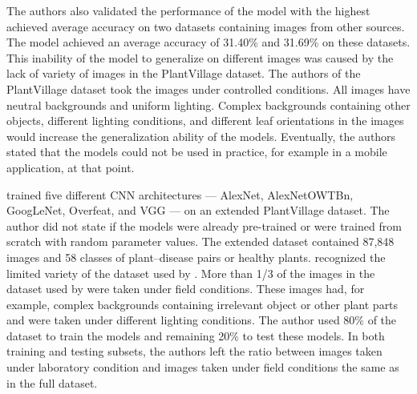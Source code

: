 \documentclass{BachelorBUI}
\begin{document}
        The authors also validated the performance of the model with the highest achieved average accuracy on two datasets containing images from other sources. The model achieved an average accuracy of 31.40\% and 31.69\% on these datasets. This inability of the model to generalize on different images was caused by the lack of variety of images in the PlantVillage dataset. The authors of the PlantVillage dataset took the images under controlled conditions. All images have neutral backgrounds and uniform lighting. Complex backgrounds containing other objects, different lighting conditions, and different leaf orientations in the images would increase the generalization ability of the models. Eventually, the authors stated that the models could not be used in practice, for example in a mobile application, at that point.

        \textcite{Ferentinos:2018} trained five different CNN architectures --- AlexNet, AlexNetOWTBn, GoogLeNet, Overfeat, and VGG --- on an extended PlantVillage dataset. The author did not state if the models were already pre-trained or were trained from scratch with random parameter values. The extended dataset contained 87,848 images and 58 classes of plant--disease pairs or healthy plants. \textcite{Ferentinos:2018} recognized the limited variety of the dataset used by \textcite{Mohanty:2016}. More than 1/3 of the images in the dataset used by \textcite{Ferentinos:2018} were taken under field conditions. These images had, for example, complex backgrounds containing irrelevant object or other plant parts and were taken under different lighting conditions. The author used 80\% of the dataset to train the models and remaining 20\% to test these models. In both training and testing subsets, the authors left the ratio between images taken under laboratory condition and images taken under field conditions the same as in the full dataset.
\end{document}
